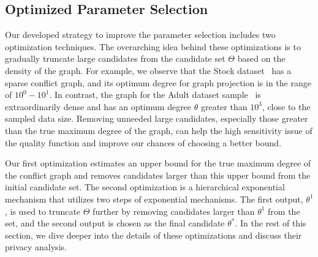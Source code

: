 \subsection{Optimized Parameter Selection}\label{sec:dc_aware}

Our developed strategy to improve the parameter selection includes two optimization techniques. The overarching idea behind these optimizations is to gradually truncate large candidates from the candidate set $\Theta$ based on the density of the graph. For example, we observe that the Stock dataset~\cite{oleh_onyshchak_2020} has a sparse conflict graph, and its optimum degree for graph projection is in the range of $10^0-10^1$. In contrast, the graph for the Adult dataset sample~\cite{misc_adult_2} is extraordinarily dense and has an optimum degree $\theta$ greater than $10^3$, close to the sampled data size. 
Removing unneeded large candidates, especially those greater than the true maximum degree of the graph, can help the high sensitivity issue of the quality function and improve our chances of choosing a better bound. 

Our first optimization estimates an upper bound for the true maximum degree of the conflict graph and removes candidates larger than this upper bound from the initial candidate set. The second optimization is a hierarchical exponential mechanism that utilizes two steps of exponential mechanisms. The first output, $\theta^1$, is used to truncate $\Theta$ further by removing candidates larger than $\theta^1$ from the set, and the second output is chosen as the final candidate $\theta^*$. In the rest of this section, we dive deeper into the details of these optimizations and discuss their privacy analysis. 



